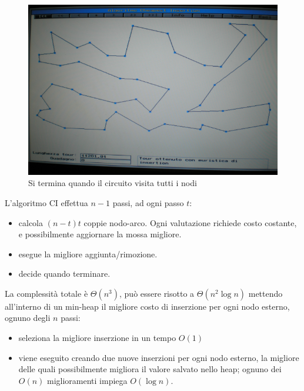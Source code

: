 \documentclass{article}
\begin{document}
\begin{figure}[H]
    \centering
    \includegraphics[scale=0.5]{images/cheap_ins3.png}
    \caption{Si termina quando il circuito visita tutti i nodi}
\end{figure}
L'algoritmo CI effettua $n-1$ passi, ad ogni passo $t$:
\begin{itemize}
    \item calcola $(n-t)t$ coppie nodo-arco. Ogni valutazione richiede costo costante, e possibilmente
          aggiornare la mossa migliore.
    \item esegue la migliore aggiunta/rimozione.
    \item decide quando terminare.
\end{itemize}
La complessità totale è $\Theta(n^3)$, può essere risotto a $\Theta(n^2\log n)$ mettendo all'interno di
un min-heap il migliore costo di inserzione per ogni nodo esterno, ognuno degli $n$ passi:
\begin{itemize}
    \item seleziona la migliore inserzione in un tempo $O(1)$
    \item viene eseguito creando due nuove inserzioni per ogni nodo esterno, la migliore delle
          quali possibilmente migliora il valore salvato nello heap; ognuno dei $O(n)$ miglioramenti
          impiega $O(\log n)$.
\end{itemize}
\end{document}
